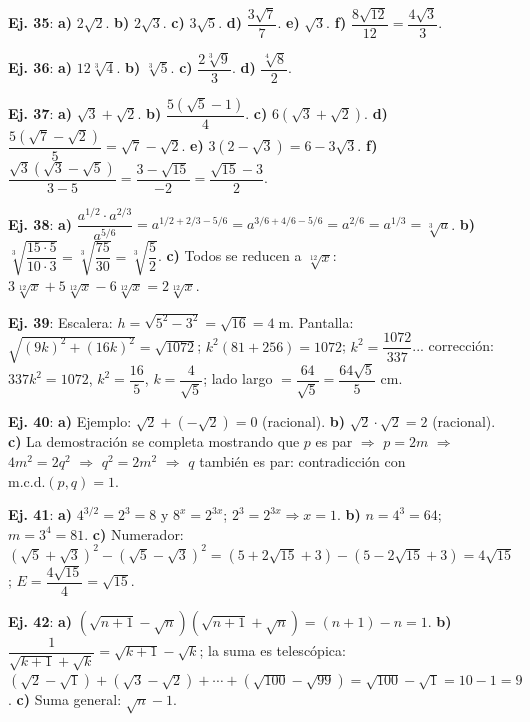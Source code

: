 \documentclass[11pt, letterpaper]{article}
\begin{document}
\medskip

\begin{tcolorbox}[answerbox, title={Bloque J — Racionalización y desafíos}]

\noindent\textbf{Ej. 35}: \textbf{a)} $2\sqrt{2}$. \textbf{b)} $2\sqrt{3}$. \textbf{c)} $3\sqrt{5}$. \textbf{d)} $\dfrac{3\sqrt{7}}{7}$. \textbf{e)} $\sqrt{3}$. \textbf{f)} $\dfrac{8\sqrt{12}}{12}=\dfrac{4\sqrt{3}}{3}$.

\medskip

\noindent\textbf{Ej. 36}: \textbf{a)} $12\sqrt[3]{4}$. \textbf{b)} $\sqrt[3]{5}$. \textbf{c)} $\dfrac{2\sqrt[3]{9}}{3}$. \textbf{d)} $\dfrac{\sqrt[4]{8}}{2}$.

\medskip

\noindent\textbf{Ej. 37}: \textbf{a)} $\sqrt{3}+\sqrt{2}$. \textbf{b)} $\dfrac{5(\sqrt{5}-1)}{4}$. \textbf{c)} $6(\sqrt{3}+\sqrt{2})$. \textbf{d)} $\dfrac{5(\sqrt{7}-\sqrt{2})}{5}=\sqrt{7}-\sqrt{2}$. \textbf{e)} $3(2-\sqrt{3})=6-3\sqrt{3}$. \textbf{f)} $\dfrac{\sqrt{3}(\sqrt{3}-\sqrt{5})}{3-5}=\dfrac{3-\sqrt{15}}{-2}=\dfrac{\sqrt{15}-3}{2}$.

\medskip

\noindent\textbf{Ej. 38}: \textbf{a)} $\dfrac{a^{1/2}\cdot a^{2/3}}{a^{5/6}}=a^{1/2+2/3-5/6}=a^{3/6+4/6-5/6}=a^{2/6}=a^{1/3}=\sqrt[3]{a}$. \textbf{b)} $\sqrt[3]{\dfrac{15\cdot5}{10\cdot3}}=\sqrt[3]{\dfrac{75}{30}}=\sqrt[3]{\dfrac{5}{2}}$. \textbf{c)} Todos se reducen a $\sqrt[12]{x}$: $3\sqrt[12]{x}+5\sqrt[12]{x}-6\sqrt[12]{x}=2\sqrt[12]{x}$.

\medskip

\noindent\textbf{Ej. 39}: Escalera: $h=\sqrt{5^2-3^2}=\sqrt{16}=4\;\text{m}$. Pantalla: $\sqrt{(9k)^2+(16k)^2}=\sqrt{1072}$; $k^2(81+256)=1072$; $k^2=\dfrac{1072}{337}$... corrección: $337k^2=1072$, $k^2=\dfrac{16}{5}$, $k=\dfrac{4}{\sqrt{5}}$; lado largo $=\dfrac{64}{\sqrt{5}}=\dfrac{64\sqrt{5}}{5}$ cm.

\medskip

\noindent\textbf{Ej. 40}: \textbf{a)} Ejemplo: $\sqrt{2}+(-\sqrt{2})=0$ (racional). \textbf{b)} $\sqrt{2}\cdot\sqrt{2}=2$ (racional). \textbf{c)} La demostración se completa mostrando que $p$ es par $\Rightarrow$ $p=2m$ $\Rightarrow$ $4m^2=2q^2$ $\Rightarrow$ $q^2=2m^2$ $\Rightarrow$ $q$ también es par: contradicción con $\text{m.c.d.}(p,q)=1$.

\medskip

\noindent\textbf{Ej. 41}: \textbf{a)} $4^{3/2}=2^3=8$ y $8^x=2^{3x}$; $2^3=2^{3x}\Rightarrow x=1$. \textbf{b)} $n=4^3=64$; $m=3^4=81$. \textbf{c)} Numerador: $(\sqrt{5}+\sqrt{3})^2-(\sqrt{5}-\sqrt{3})^2=(5+2\sqrt{15}+3)-(5-2\sqrt{15}+3)=4\sqrt{15}$; $E=\dfrac{4\sqrt{15}}{4}=\sqrt{15}$.

\medskip

\noindent\textbf{Ej. 42}: \textbf{a)} $(\sqrt{n+1}-\sqrt{n})(\sqrt{n+1}+\sqrt{n})=(n+1)-n=1$. \textbf{b)} $\dfrac{1}{\sqrt{k+1}+\sqrt{k}}=\sqrt{k+1}-\sqrt{k}$; la suma es telescópica: $(\sqrt{2}-\sqrt{1})+(\sqrt{3}-\sqrt{2})+\cdots+(\sqrt{100}-\sqrt{99})=\sqrt{100}-\sqrt{1}=10-1=9$. \textbf{c)} Suma general: $\sqrt{n}-1$.
\end{tcolorbox}
\end{document}

